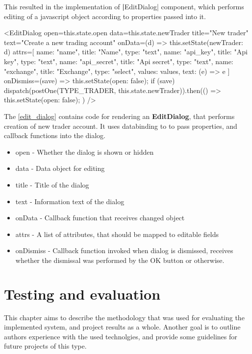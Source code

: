 This resulted in the implementation of \textbf|EditDialog| component, which performs editing of a javascript object according
to properties passed into it.

\begin{code}[language=html,label={edit_dialog},caption={EditDialog for creation of Trader account}]
<EditDialog
    open={this.state.open}
    data={this.state.newTrader}
    title="New trader"
    text="Create a new trading account"
    onData={(d) => {
        this.setState({newTrader: d})
    }}
    attrs={[
        {name: "name", title: "Name", type: "text"},
        {name: "api_key", title: "Api key", type: "text"},
        {name: "api_secret", title: "Api secret", type: "text"},
        {name: "exchange", title: "Exchange", type: "select", values: values, text: (e) => e}
    ]}
    onDismiss={(save) => {
        this.setState({open: false});
        if (save) {
            dispatch(postOne(TYPE_TRADER, this.state.newTrader)).then(() => {
                this.setState({open: false});
            })
        }
    }}
/>
\end{code}

The \autoref{edit_dialog} contains code for rendering an \textbf{EditDialog}, that performs creation of new trader
account. It uses databinding to to pass properties, and callback functions into the dialog.
\begin{itemize}
    \item {open -} Whether the dialog is shown or hidden
    \item {data - } Data object for editing
    \item {title - } Title of the dialog
    \item {text - } Information text of the dialog
    \item {onData - } Callback function that receives changed object
    \item {attrs - } A list of attributes, that should be mapped to editable fields
    \item {onDismiss - } Callback function invoked when dialog is dismissed, receives whether the dismissal was performed
    by the OK button or otherwise.
\end{itemize}


\chapter{Testing and evaluation}
This chapter aims to describe the methodology that was used for evaluating the implemented system, and project results
as a whole. Another goal is to outline authors experience with the used technolgies, and provide some guidelines for future
projects of this type.

